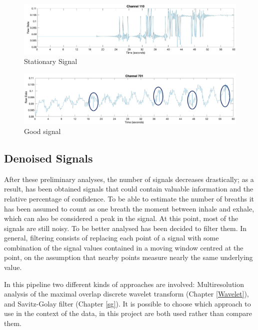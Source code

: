\begin{figure}[H]
    \centering
    \includegraphics[width=\textwidth]{img/spike_total.jpg}
    \caption{Stationary Signal}
    \label{fig:spikeTotal}
\end{figure}

\begin{figure}[H]
    \centering
    \includegraphics[width=\textwidth]{img/goodSpikes.png}
    \caption{Good signal}
    \label{fig:goodSignal}
\end{figure}

\subsection{Denoised Signals}
After these preliminary analyses, the number of signals decreases drastically; as a result, has been obtained signals that could contain valuable information and the relative percentage of confidence.
To be able to estimate the number of breaths it has been assumed to count as one breath the moment between inhale and exhale, which can also be considered a peak in the signal.
At this point, most of the signals are still noisy. To be better analysed has been decided to filter them. In general, filtering consists of replacing each point of a signal with some combination of the signal values contained in a moving window centred at the point, on the assumption that nearby points measure nearly the same underlying value.

In this pipeline two different kinds of approaches are involved: Multiresolution analysis of the maximal overlap discrete wavelet transform (Chapter \ref{Wavelet}), and Savitz-Golay filter (Chapter \ref{sg}).
It is possible to choose which approach to use in the context of the data, in this project are both used rather than compare them.


